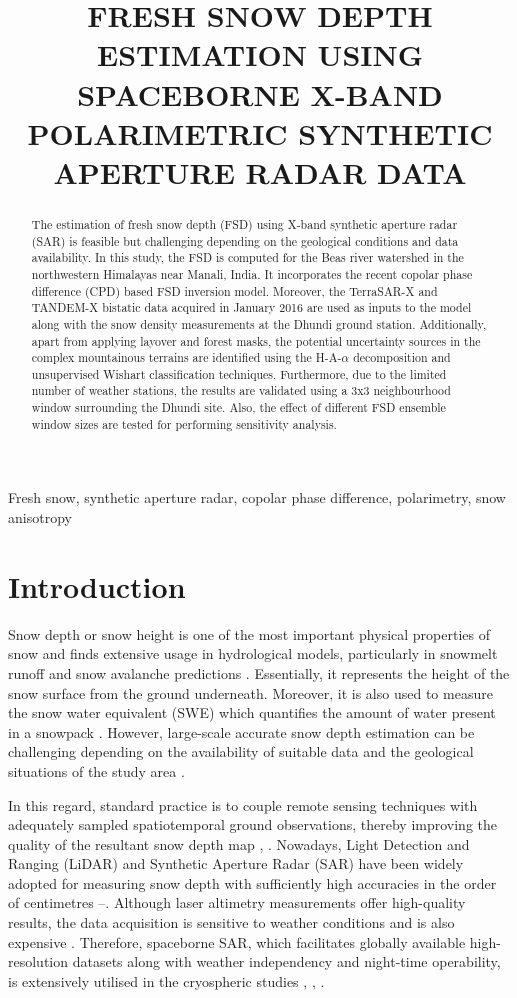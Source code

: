 \documentclass{article}
\title{FRESH SNOW DEPTH ESTIMATION USING SPACEBORNE X-BAND POLARIMETRIC SYNTHETIC APERTURE RADAR DATA}
\begin{document}
%
\maketitle
%
\begin{abstract}
The estimation of fresh snow depth (FSD) using X-band synthetic aperture radar (SAR) is feasible but challenging depending on the geological conditions and data availability. In this study, the FSD is computed for the Beas river watershed in the northwestern Himalayas near Manali, India. It incorporates the recent copolar phase difference (CPD) based FSD inversion model. Moreover, the TerraSAR-X and TANDEM-X bistatic data acquired in January 2016 are used as inputs to the model along with the snow density measurements at the Dhundi ground station. Additionally, apart from applying layover and forest masks, the potential uncertainty sources in the complex mountainous terrains are identified using the H-A-$\alpha$ decomposition and unsupervised Wishart classification techniques. Furthermore, due to the limited number of weather stations, the results are validated using a 3x3 neighbourhood window surrounding the Dhundi site. Also, the effect of different FSD ensemble window sizes are tested for performing sensitivity analysis.
\end{abstract}
%
\begin{keywords}
Fresh snow, synthetic aperture radar, copolar phase difference, polarimetry, snow anisotropy
\end{keywords}
%
\section{Introduction}
\label{sec:intro}
Snow depth or snow height is one of the most important physical properties of snow and finds extensive usage in hydrological models, particularly in snowmelt runoff and snow avalanche predictions \cite{Thakur2012}. Essentially, it represents the height of the snow surface from the ground underneath. Moreover, it is also used to measure the snow water equivalent (SWE) which quantifies the amount of water present in a snowpack \cite{Tedesco2015}. However, large-scale accurate snow depth estimation can be challenging depending on the availability of suitable data and the geological situations of the study area \cite{Leinss2014}.

In this regard, standard practice is to couple remote sensing techniques with adequately sampled spatiotemporal ground observations, thereby improving the quality of the resultant snow depth map \cite{Thakur2012}, \cite{Leinss2014}. Nowadays, Light Detection and Ranging (LiDAR) and Synthetic Aperture Radar (SAR) have been widely adopted for measuring snow depth with sufficiently high accuracies in the order of centimetres \cite{Thakur2012}--\cite{Deems2013}. Although laser altimetry measurements offer high-quality results, the data acquisition is sensitive to weather conditions and is also expensive \cite{Deems2013}. Therefore, spaceborne SAR, which facilitates globally available high-resolution datasets along with weather independency and night-time operability, is extensively utilised in the cryospheric studies \cite{Thakur2012}, \cite{Leinss2014}, \cite{Moreira2013}.
\end{document}
